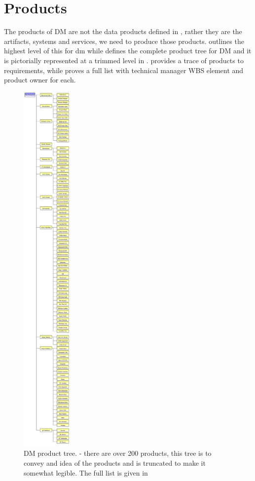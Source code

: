 \section{Products \label{sect:products}}

The products of DM are not the data products defined in , rather they are the artifacts, systems and services,  we need to produce those products.  outlines the highest level of this for dm while    defines the complete product tree for DM and it is pictorially represented at a trimmed level in  . 
 provides a trace of products to requirements, while  proves a full list with technical manager WBS element and product owner for each.  

\begin{figure}[htbp]
	\begin{center}
		 \includegraphics[height=19cm]{ProductTree}
		 \caption{DM product tree. \label{fig:prods}- there are over 200 products, this tree is to convey and idea of the products and is truncated to make it somewhat legible. 
		 The full list is given in 
	 }
		  
	 \end{center}
 \end{figure}

